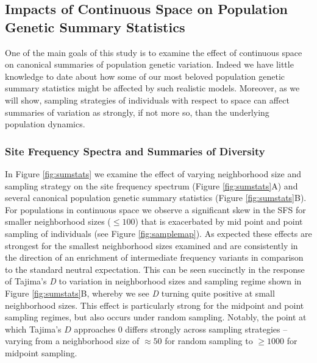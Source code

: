 \documentclass[10pt,twoside,lineno]{gsajnl}
\begin{document}

\subsection{Impacts of Continuous Space on Population Genetic Summary Statistics}
One of the main goals of this study is to examine the effect of continuous space on canonical summaries of population genetic variation. Indeed we have little knowledge to date about how some of our most beloved population genetic summary statistics might be affected by such realistic models. Moreover, as we will show, sampling strategies of individuals with respect to space can affect summaries of variation as strongly, if not more so, than the underlying population dynamics. 

\subsubsection{Site Frequency Spectra and Summaries of Diversity}
In Figure \ref{fig:sumstats} we examine the effect of varying neighborhood size and sampling strategy on the site frequency spectrum (Figure \ref{fig:sumstats}A) and several canonical population genetic summary statistics (Figure \ref{fig:sumstats}B). For populations in continuous space we observe a significant skew in the SFS for smaller neighborhood sizes ($\leq 100$) that is exacerbated by mid point and point sampling of individuals (see Figure \ref{fig:samplemap}). As expected these effects are strongest for the smallest neighborhood sizes examined and are consistently in the direction of an enrichment of intermediate frequency variants in comparison to the standard neutral expectation. This can be seen succinctly in the response of Tajima's \textit{D} to variation in neighborhood sizes and sampling regime shown in Figure \ref{fig:sumstats}B, whereby we see \textit{D} turning quite positive at small neighborhood sizes. This effect is particularly strong for the midpoint and point sampling regimes, but also occurs under random sampling. Notably, the point at which Tajima's $D$ approaches 0 differs strongly across sampling strategies -- varying from a neighborhood size of $\approx50$ for random sampling to $\geq1000$ for midpoint sampling. 
\end{document}
